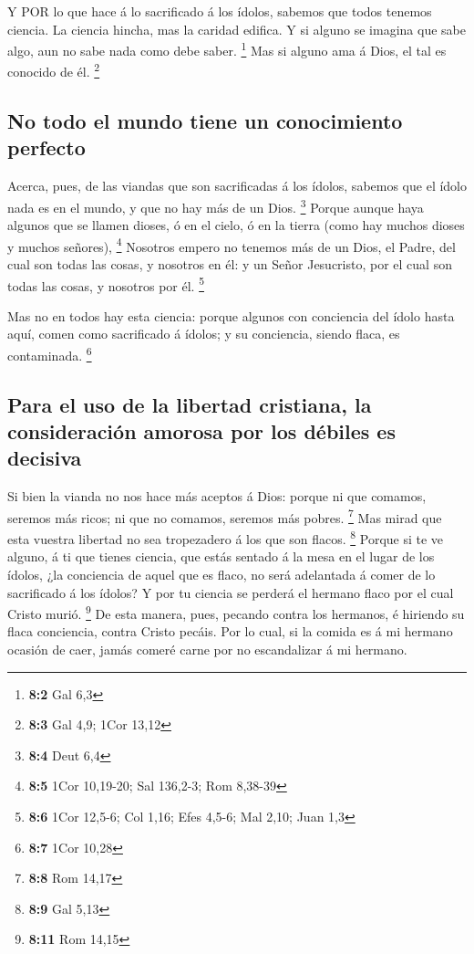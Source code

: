  Y POR lo que hace á lo sacrificado á los ídolos, sabemos
que todos tenemos ciencia. La ciencia hincha, mas la caridad edifica.
 Y si alguno se imagina que sabe algo, aun no sabe nada como
debe saber. \footnote{\textbf{8:2} Gal 6,3}  Mas si alguno
ama á Dios, el tal es conocido de él. \footnote{\textbf{8:3} Gal 4,9;
  1Cor 13,12}

\hypertarget{no-todo-el-mundo-tiene-un-conocimiento-perfecto}{%
\subsection{No todo el mundo tiene un conocimiento
perfecto}\label{no-todo-el-mundo-tiene-un-conocimiento-perfecto}}

 Acerca, pues, de las viandas que son sacrificadas á los
ídolos, sabemos que el ídolo nada es en el mundo, y que no hay más de un
Dios. \footnote{\textbf{8:4} Deut 6,4}  Porque aunque haya
algunos que se llamen dioses, ó en el cielo, ó en la tierra (como hay
muchos dioses y muchos señores), \footnote{\textbf{8:5} 1Cor 10,19-20;
  Sal 136,2-3; Rom 8,38-39}  Nosotros empero no tenemos más
de un Dios, el Padre, del cual son todas las cosas, y nosotros en él: y
un Señor Jesucristo, por el cual son todas las cosas, y nosotros por él.
\footnote{\textbf{8:6} 1Cor 12,5-6; Col 1,16; Efes 4,5-6; Mal 2,10; Juan
  1,3}

 Mas no en todos hay esta ciencia: porque algunos con
conciencia del ídolo hasta aquí, comen como sacrificado á ídolos; y su
conciencia, siendo flaca, es contaminada. \footnote{\textbf{8:7} 1Cor
  10,28}

\hypertarget{para-el-uso-de-la-libertad-cristiana-la-consideraciuxf3n-amorosa-por-los-duxe9biles-es-decisiva}{%
\subsection{Para el uso de la libertad cristiana, la consideración
amorosa por los débiles es
decisiva}\label{para-el-uso-de-la-libertad-cristiana-la-consideraciuxf3n-amorosa-por-los-duxe9biles-es-decisiva}}

 Si bien la vianda no nos hace más aceptos á Dios: porque ni
que comamos, seremos más ricos; ni que no comamos, seremos más pobres.
\footnote{\textbf{8:8} Rom 14,17}  Mas mirad que esta
vuestra libertad no sea tropezadero á los que son flacos. \footnote{\textbf{8:9}
  Gal 5,13}  Porque si te ve alguno, á ti que tienes
ciencia, que estás sentado á la mesa en el lugar de los ídolos, ¿la
conciencia de aquel que es flaco, no será adelantada á comer de lo
sacrificado á los ídolos?  Y por tu ciencia se perderá el
hermano flaco por el cual Cristo murió. \footnote{\textbf{8:11} Rom
  14,15}  De esta manera, pues, pecando contra los
hermanos, é hiriendo su flaca conciencia, contra Cristo pecáis.
 Por lo cual, si la comida es á mi hermano ocasión de caer,
jamás comeré carne por no escandalizar á mi hermano.

